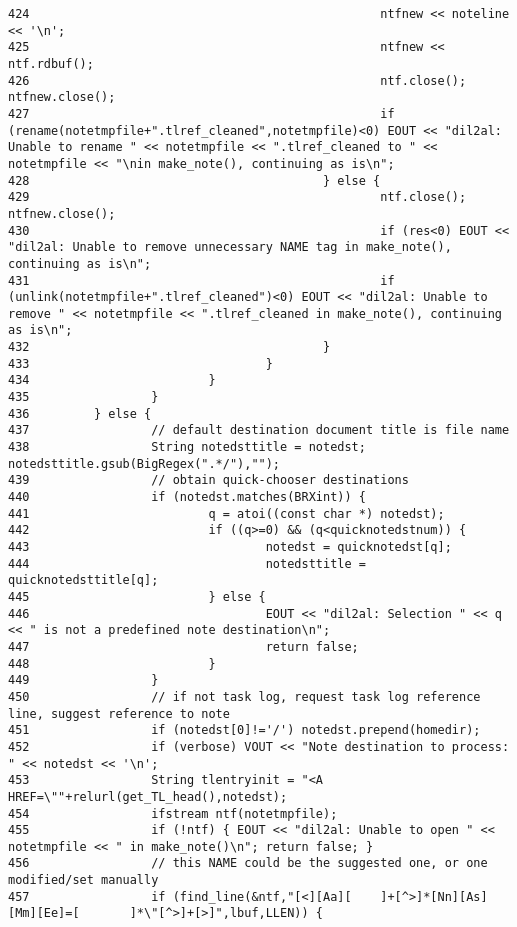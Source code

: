 \begin{verbatim}
424                                                 ntfnew << noteline << '\n';
425                                                 ntfnew << ntf.rdbuf();
426                                                 ntf.close(); ntfnew.close();
427                                                 if (rename(notetmpfile+".tlref_cleaned",notetmpfile)<0) EOUT << "dil2al: Unable to rename " << notetmpfile << ".tlref_cleaned to " << notetmpfile << "\nin make_note(), continuing as is\n";
428                                         } else {
429                                                 ntf.close(); ntfnew.close();
430                                                 if (res<0) EOUT << "dil2al: Unable to remove unnecessary NAME tag in make_note(), continuing as is\n";
431                                                 if (unlink(notetmpfile+".tlref_cleaned")<0) EOUT << "dil2al: Unable to remove " << notetmpfile << ".tlref_cleaned in make_note(), continuing as is\n";
432                                         }
433                                 }
434                         }
435                 }
436         } else {
437                 // default destination document title is file name
438                 String notedsttitle = notedst; notedsttitle.gsub(BigRegex(".*/"),"");
439                 // obtain quick-chooser destinations
440                 if (notedst.matches(BRXint)) {
441                         q = atoi((const char *) notedst);
442                         if ((q>=0) && (q<quicknotedstnum)) {
443                                 notedst = quicknotedst[q];
444                                 notedsttitle = quicknotedsttitle[q];
445                         } else {
446                                 EOUT << "dil2al: Selection " << q << " is not a predefined note destination\n";
447                                 return false;
448                         }
449                 }
450                 // if not task log, request task log reference line, suggest reference to note
451                 if (notedst[0]!='/') notedst.prepend(homedir);
452                 if (verbose) VOUT << "Note destination to process: " << notedst << '\n';
453                 String tlentryinit = "<A HREF=\""+relurl(get_TL_head(),notedst);
454                 ifstream ntf(notetmpfile);
455                 if (!ntf) { EOUT << "dil2al: Unable to open " << notetmpfile << " in make_note()\n"; return false; }
456                 // this NAME could be the suggested one, or one modified/set manually
457                 if (find_line(&ntf,"[<][Aa][    ]+[^>]*[Nn][As][Mm][Ee]=[       ]*\"[^>]+[>]",lbuf,LLEN)) {

\end{verbatim}
